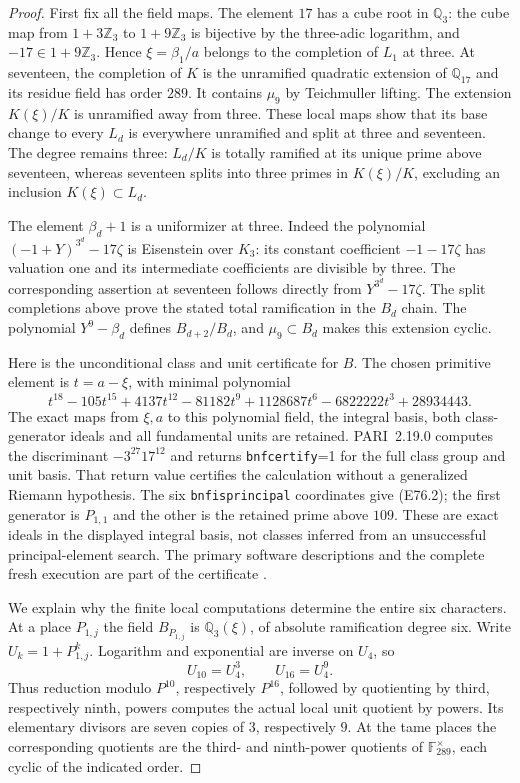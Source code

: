 \begin{proof}
First fix all the field maps. The element $17$ has a cube
root in $\mathbb Q_3$: the cube map from $1+3\mathbb Z_3$
to $1+9\mathbb Z_3$ is bijective by the three-adic logarithm,
and $-17\in1+9\mathbb Z_3$. Hence $\xi=\beta_1/a$ belongs
to the completion of $L_1$ at three. At seventeen, the
completion of $K$ is the unramified quadratic extension
of $\mathbb Q_{17}$ and its residue field has order $289$.
It contains $\mu_9$ by Teichmuller lifting. The extension
$K(\xi)/K$ is unramified away from three. These local maps
show that its base change to every $L_d$ is everywhere
unramified and split at three and seventeen. The degree
remains three: $L_d/K$ is totally ramified at its unique
prime above seventeen, whereas seventeen splits into
three primes in $K(\xi)/K$, excluding an inclusion
$K(\xi)\subset L_d$.

The element $\beta_d+1$ is a uniformizer at three.
Indeed the polynomial $(-1+Y)^{3^d}-17\zeta$ is
Eisenstein over $K_3$: its constant coefficient
$-1-17\zeta$ has valuation one and its intermediate
coefficients are divisible by three. The corresponding
assertion at seventeen follows directly from
$Y^{3^d}-17\zeta$. The split completions above prove
the stated total ramification in the $B_d$ chain.
The polynomial $Y^9-\beta_d$ defines $B_{d+2}/B_d$,
and $\mu_9\subset B_d$ makes this extension cyclic.

Here is the unconditional class and unit certificate for
$B$. The chosen primitive element is $t=a-\xi$, with
minimal polynomial
\[
 t^{18}-105t^{15}+4137t^{12}-81182t^9
              +1128687t^6-6822222t^3+28934443.
 \tag{E76.12}
\]
The exact maps from $\xi,a$ to this polynomial field,
the integral basis, both class-generator ideals and all
fundamental units are retained. PARI~2.19.0 computes
the discriminant $-3^{27}17^{12}$ and returns
\texttt{bnfcertify}=1 for the full class group and unit
basis. That return value certifies the calculation
without a generalized Riemann hypothesis. The six
\texttt{bnfisprincipal} coordinates give (E76.2);
the first generator is $P_{1,1}$ and the other is the
retained prime above $109$. These are exact ideals in
the displayed integral basis, not classes inferred
from an unsuccessful principal-element search.
The primary software descriptions and the complete
fresh execution are part of the certificate
\cite{E_PARICertifiedUnits}.

We explain why the finite local computations determine
the entire six characters. At a place $P_{1,j}$ the
field $B_{P_{1,j}}$ is $\mathbb Q_3(\xi)$, of absolute
ramification degree six. Write $U_k=1+P_{1,j}^k$.
Logarithm and exponential are inverse on $U_4$, so
\[
                     U_{10}=U_4^3,\qquad U_{16}=U_4^9.
 \tag{E76.13}
\]
Thus reduction modulo $P^{10}$, respectively $P^{16}$,
followed by quotienting by third, respectively ninth,
powers computes the actual local unit quotient by
powers. Its elementary divisors are seven copies of
$3$, respectively $9$. At the tame places the
corresponding quotients are the third- and ninth-power
quotients of $\mathbb F_{289}^\times$, each cyclic of
the indicated order.


\end{proof}
